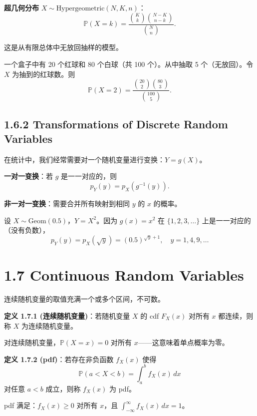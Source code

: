 \textbf{超几何分布} $X \sim \text{Hypergeometric}(N, K, n)$：
\[
\mathbb{P}(X = k) = \frac{\binom{K}{k}\binom{N-K}{n-k}}{\binom{N}{n}}.
\tag{1.6.5}\label{eq:hypergeometric-ch1}
\]

这是从有限总体中无放回抽样的模型。

\begin{example}[超几何分布]\label{ex:hypergeometric-ch1}
一个盒子中有 20 个红球和 80 个白球（共 100 个）。从中抽取 5 个（无放回）。令 $X$ 为抽到的红球数。则
\[
\mathbb{P}(X = 2) = \frac{\binom{20}{2}\binom{80}{3}}{\binom{100}{5}}.
\]
\end{example}

\subsection{1.6.2 Transformations of Discrete Random Variables}

在统计中，我们经常需要对一个随机变量进行变换：$Y = g(X)$。

\textbf{一对一变换}：若 $g$ 是一一对应的，则
\[
p_Y(y) = p_X(g^{-1}(y)).
\tag{1.6.6}\label{eq:discrete-one-to-one-ch1}
\]

\textbf{非一对一变换}：需要合并所有映射到相同 $y$ 的 $x$ 的概率。

\begin{example}[离散变换]\label{ex:discrete-transform-ch1}
设 $X \sim \text{Geom}(0.5)$，$Y = X^2$。因为 $g(x) = x^2$ 在 $\{1, 2, 3, \ldots\}$ 上是一一对应的（没有负数），
\[
p_Y(y) = p_X(\sqrt{y}) = (0.5)^{\sqrt{y}+1}, \quad y = 1, 4, 9, \ldots
\]
\end{example}

\section{1.7 Continuous Random Variables}\label{sec:1.7}

连续随机变量的取值充满一个或多个区间，不可数。

\begin{remark}
\textbf{定义 1.7.1 (连续随机变量)}：若随机变量 $X$ 的 cdf $F_X(x)$ 对所有 $x$ 都连续，则称 $X$ 为连续随机变量。
\end{remark}

对连续随机变量，$\mathbb{P}(X = x) = 0$ 对所有 $x$——这意味着单点概率为零。

\begin{remark}
\textbf{定义 1.7.2 (pdf)}：若存在非负函数 $f_X(x)$ 使得
\[
\mathbb{P}(a < X < b) = \int_a^b f_X(x) \, dx
\]
对任意 $a < b$ 成立，则称 $f_X(x)$ 为 pdf。

pdf 满足：$f_X(x) \geq 0$ 对所有 $x$，且 $\int_{-\infty}^{\infty} f_X(x) \, dx = 1$。
\end{remark}

